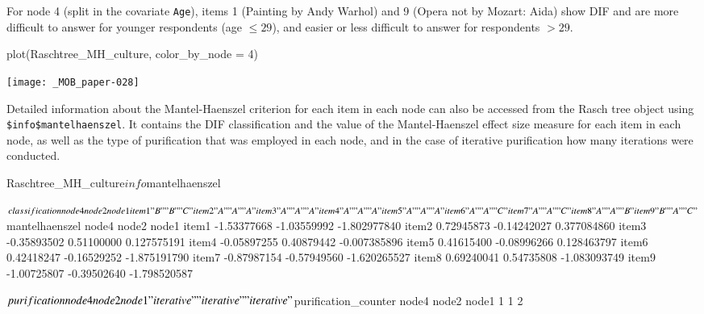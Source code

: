 \documentclass[doc,floatsintext,natbib]{apa7}
\begin{document}

For node 4 (split in the covariate \texttt{Age}), items 1 (Painting by Andy Warhol) and 9 (Opera not by Mozart: Aida) show DIF and are %
more difficult to answer for younger respondents (age $\leq 29$), and easier or less difficult to answer for respondents $>29$.

\begin{Schunk}
\begin{Sinput}
 plot(Raschtree_MH_culture, color_by_node = 4)
\end{Sinput}
\end{Schunk}
\texttt{[image: \_MOB\_paper-028]}

Detailed information about the Mantel-Haenszel criterion for each item in each node can also be accessed from the Rasch tree object using \texttt{\$info\$mantelhaenszel}. It contains the DIF classification and the value of the Mantel-Haenszel effect size measure for each item in each node, as well as the type of purification that was employed in each node, and in the case of iterative purification how many iterations were conducted.

\begin{Schunk}
\begin{Sinput}
 Raschtree_MH_culture$info$mantelhaenszel
\end{Sinput}
\begin{Soutput}
$classification
      node4 node2 node1
item1 "B"   "B"   "C"  
item2 "A"   "A"   "A"  
item3 "A"   "A"   "A"  
item4 "A"   "A"   "A"  
item5 "A"   "A"   "A"  
item6 "A"   "A"   "C"  
item7 "A"   "A"   "C"  
item8 "A"   "A"   "B"  
item9 "B"   "A"   "C"  

$mantelhaenszel
            node4       node2        node1
item1 -1.53377668 -1.03559992 -1.802977840
item2  0.72945873 -0.14242027  0.377084860
item3 -0.35893502  0.51100000  0.127575191
item4 -0.05897255  0.40879442 -0.007385896
item5  0.41615400 -0.08996266  0.128463797
item6  0.42418247 -0.16529252 -1.875191790
item7 -0.87987154 -0.57949560 -1.620265527
item8  0.69240041  0.54735808 -1.083093749
item9 -1.00725807 -0.39502640 -1.798520587

$purification
      node4       node2       node1 
"iterative" "iterative" "iterative" 

$purification_counter
node4 node2 node1 
    1     1     2 
\end{Soutput}
\end{Schunk}
\end{document}
